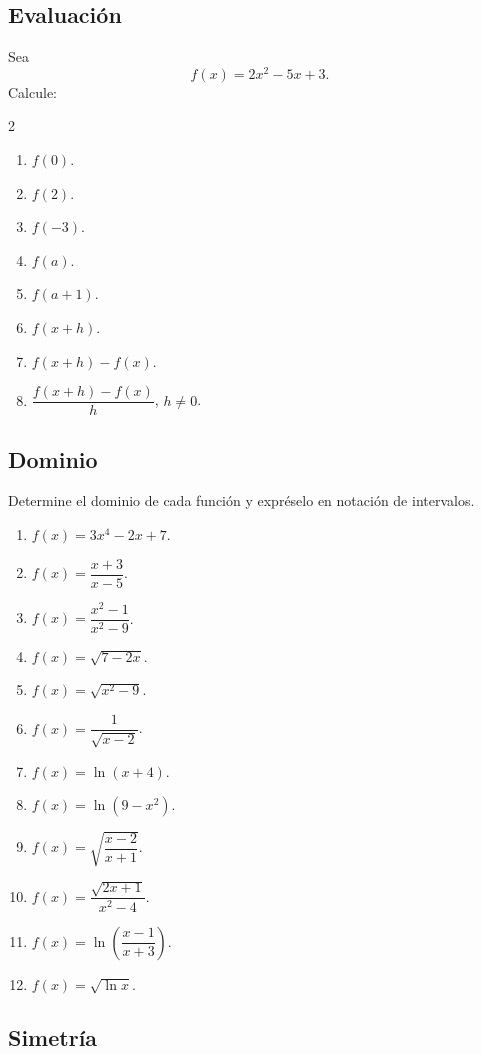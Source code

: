 \documentclass[12pt]{article}
\theoremstyle{remark}
\begin{document}
\subsection*{Evaluación}

Sea
\[
f(x)=2x^2-5x+3.
\]
Calcule:
\begin{multicols}{2}
\begin{enumerate}
    \item $f(0)$.
    \item $f(2)$.
    \item $f(-3)$.
    \item $f(a)$.
    \item $f(a+1)$.
    \item $f(x+h)$.
    \item $f(x+h)-f(x)$.
    \item $\dfrac{f(x+h)-f(x)}{h}$, $h\neq0$.
\end{enumerate}
\end{multicols}

\subsection*{Dominio}

Determine el dominio de cada función y expréselo en notación de intervalos.

\begin{enumerate}
    \item $f(x)=3x^4-2x+7$.
    \item $f(x)=\dfrac{x+3}{x-5}$.
    \item $f(x)=\dfrac{x^2-1}{x^2-9}$.
    \item $f(x)=\sqrt{7-2x}$.
    \item $f(x)=\sqrt{x^2-9}$.
    \item $f(x)=\dfrac{1}{\sqrt{x-2}}$.
    \item $f(x)=\ln(x+4)$.
    \item $f(x)=\ln(9-x^2)$.
    \item $f(x)=\sqrt{\dfrac{x-2}{x+1}}$.
    \item $f(x)=\dfrac{\sqrt{2x+1}}{x^2-4}$.
    \item $f(x)=\ln\left(\dfrac{x-1}{x+3}\right)$.
    \item $f(x)=\sqrt{\ln x}$.
\end{enumerate}

\subsection*{Simetría}
\end{document}
